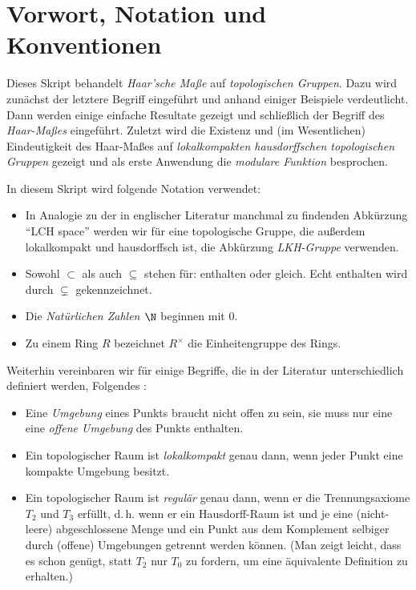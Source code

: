
\chapter{Vorwort, Notation und Konventionen}
Dieses Skript behandelt \emph{Haar'sche Maße} auf \emph{topologischen Gruppen}.
Dazu wird zunächst der letztere Begriff eingeführt und anhand einiger Beispiele
verdeutlicht. Dann werden einige einfache Resultate gezeigt und schließlich der
Begriff des \emph{Haar-Maßes} eingeführt. Zuletzt wird die Existenz und
(im Wesentlichen) Eindeutigkeit des Haar-Maßes auf \emph{lokalkompakten
hausdorffschen topologischen Gruppen} gezeigt und als erste Anwendung die
\emph{modulare Funktion} besprochen.


\bigskip
In diesem Skript wird folgende Notation verwendet:
\begin{itemize}
    \item
        In Analogie zu der in englischer Literatur manchmal zu findenden
        Abkürzung \enquote{LCH space} werden wir für eine topologische Gruppe,
        die außerdem lokalkompakt und hausdorffsch ist, die Abkürzung
        \emph{LKH-Gruppe} verwenden.
        
    \item
        Sowohl $\subset$ als auch $\subseteq$ stehen für: enthalten oder gleich.
        Echt enthalten wird durch $\subsetneq$ gekennzeichnet.
    
    \item
        Die \emph{Natürlichen Zahlen $\N$} beginnen mit $0$.
    
    \item
        Zu einem Ring $R$ bezeichnet $R^\times$ die Einheitengruppe des Rings.
\end{itemize}


\bigskip
Weiterhin vereinbaren wir für einige Begriffe, die in der Literatur
unterschiedlich definiert werden, Folgendes%
:
\begin{itemize}
    \item
        Eine \emph{Umgebung} eines Punkts braucht nicht offen zu sein, sie muss
        nur eine eine \emph{offene Umgebung} des Punkts enthalten.
        
    \item 
        Ein topologischer Raum ist \emph{lokalkompakt} genau dann,
        wenn jeder Punkt eine kompakte Umgebung besitzt.
        
    \item
        Ein topologischer Raum ist \emph{regulär} genau dann,
        wenn er die Trennungsaxiome $T_2$ und $T_3$ erfüllt, d.\,h. wenn er ein
        Hausdorff-Raum ist und je eine (nicht-leere) abgeschlossene Menge und 
        ein Punkt aus dem Komplement selbiger durch (offene) Umgebungen
        getrennt werden können. (Man zeigt leicht, dass es schon genügt, 
        statt $T_2$ nur $T_0$ zu fordern, um eine äquivalente Definition zu
        erhalten.)
\end{itemize}
